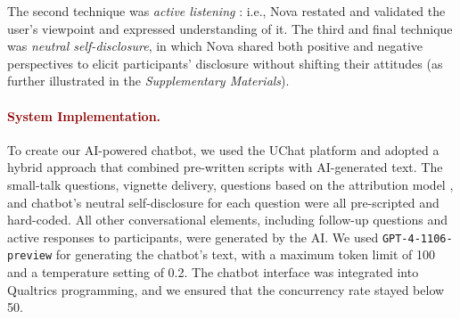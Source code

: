The second technique was \textit{active listening} \cite{active_strategies_zheng_2023}: i.e., Nova restated and validated the user's viewpoint and expressed understanding of it. 
The third and final technique was \textit{neutral self-disclosure}, in which Nova shared both positive and negative perspectives to elicit participants' disclosure \cite{disclosure_lee_2022} without shifting their attitudes (as further illustrated in the \textit{Supplementary Materials}). 


\paragraph{\textcolor{darkred}{\textbf{System Implementation.}}}

To create our AI-powered chatbot, we used the UChat platform and adopted a hybrid approach that combined pre-written scripts with AI-generated text. 
The small-talk questions, vignette delivery, questions based on the attribution model \cite{attribution_model_corrigan_2003}, and chatbot's neutral self-disclosure for each question were all pre-scripted and hard-coded. 
All other conversational elements, including follow-up questions and active responses to participants, were generated by the AI. 
We used \texttt{GPT-4-1106-preview} \cite{gpt4_achiam_2023} for generating the chatbot's text, with a maximum token limit of 100 and a temperature setting of 0.2. 
The chatbot interface was integrated into Qualtrics programming, and we ensured that the concurrency rate stayed below 50.





